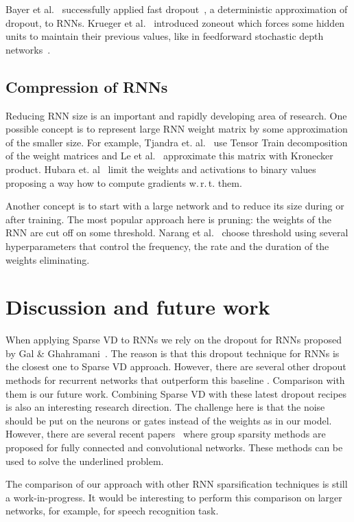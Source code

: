 \documentclass{article}
\begin{document}
Bayer et al.~ successfully applied fast dropout~\cite{fast_dropout}, a deterministic approximation of dropout, to RNNs. 
Krueger et al.~ introduced zoneout which forces some hidden units to maintain their previous values, like in feedforward stochastic depth networks~\cite{stoch}.

\subsection{Compression of RNNs}
Reducing RNN size is an important and rapidly developing area of research. One possible concept is to represent large RNN weight matrix by some approximation of the smaller size. For example, Tjandra et. al.~ use Tensor Train decomposition of the weight matrices and Le et al.~ approximate this matrix with Kronecker product. 
Hubara et. al~ limit the weights and activations to binary values proposing a way how to compute gradients w.\,r.\,t. them. 

Another concept is to start with a large network and to reduce its size during or after training. The most popular approach here is pruning: the weights of the RNN are cut off on some threshold. Narang et al.~ choose threshold using several hyperparameters that control the frequency, the rate and the duration of the weights eliminating. 

\section{Discussion and future work}
When applying Sparse VD to RNNs we rely on the dropout for RNNs proposed by Gal \& Ghahramani~. The reason is that this dropout technique for RNNs is the closest one to Sparse VD approach. However, there are several other dropout methods for recurrent networks that outperform this baseline \cite{semeniuta16,zoneout}. Comparison with them is our future work. Combining Sparse VD with these latest dropout recipes is also an interesting research direction. The challenge here is that the noise should be put on the neurons or gates instead of the weights as in our model. However, there are several recent papers~\cite{group, chris} where group sparsity methods are proposed for fully connected and convolutional networks. These methods can be used to solve the underlined problem.

The comparison of our approach with other RNN sparsification techniques is still a work-in-progress. 
It would be interesting to perform this comparison on larger networks, for example, for speech recognition task.
\end{document}
